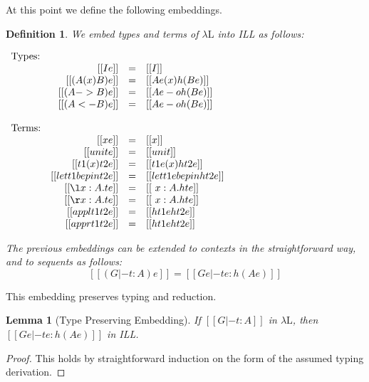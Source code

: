 \documentclass{article}
\newtheorem{lemma}[theorem]{Lemma}
\newtheorem{definition}[theorem]{Definition}
\begin{document}
At this point we define the following embeddings.
\begin{definition}
  \label{def:lambda-L_to_ILL}
  We embed types and terms of $\lambda\text{L}$ into ILL as follows:
  \begin{center}
    \begin{math}
      \begin{array}{lrllllllllllllllllll}
        \text{Types:}\\
        & [[I e]] & = & [[I]]\\
        & [[(A (x) B) e]] & = & [[A e (x) h(B e)]]\\
        & [[(A -> B) e]] & = & [[A e -o h(B e)]]\\
        & [[(A <- B) e]] & = & [[A e -o h(B e)]]\\                    
        \\
        \text{Terms:}\\
        & [[x e]] & = & [[x]]\\
        & [[unit e]] & = & [[unit]]\\
        & [[{t1 (x) t2} e]] & = & [[t1 e (x) h{t2 e}]]\\
        & [[{let t1 be p in t2} e]] & = & [[let t1 e be p in h{t2 e}]]\\
        & [[{\l x : A.t} e]] & = & [[\ x : A.h{t e}]]\\
        & [[{\r x : A.t} e]] & = & [[\ x : A.h{t e}]]\\
        & [[{appl t1 t2} e]] & = & [[h{t1 e} h{t2 e}]]\\
        & [[{appr t1 t2} e]] & = & [[h{t1 e} h{t2 e}]]\\
      \end{array}
    \end{math}
  \end{center}
  The previous embeddings can be extended to contexts in the
  straightforward way, and to sequents as follows:
  \[ [[(G |- t : A) e]] = [[G e |- t e : h(A e)]]\]
\end{definition}
\noindent
This embedding preserves typing and reduction.
\begin{lemma}[Type Preserving Embedding]
  \label{lemma:type_preserving_embedding}
  If $[[G |- t : A]]$ in $\lambda\text{L}$, then
  $[[G e |- t e : h(A e)]]$ in ILL.
\end{lemma}
\begin{proof}
  This holds by straightforward induction on the form of the assumed
  typing derivation.
\end{proof}
\end{document}
